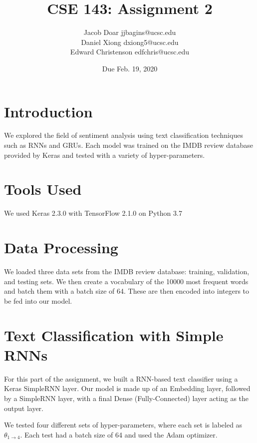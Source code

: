 \documentclass[12pt,notitlepage]{article}
\title{CSE 143: Assignment 2}
\author{Jacob Doar jjbagins@ucsc.edu\\
	Daniel Xiong dxiong5@ucsc.edu\\
	Edward Christenson edfchris@ucsc.edu}
\date{Due Feb. 19, 2020}
\begin{document}
\maketitle

\section{Introduction}
\tab We explored the field of sentiment analysis using text classification techniques such as RNNs and GRUs. Each model was trained on the IMDB review database provided by Keras and tested with a variety of hyper-parameters.

\section{Tools Used}
\tab We used Keras 2.3.0 with TensorFlow 2.1.0 on Python 3.7

\section{Data Processing}
\tab We loaded three data sets from the IMDB review database: training, validation, and testing sets. We then create a vocabulary of the 10000 most frequent words and batch them with a batch size of 64. These are then encoded into integers to be fed into our model.

\section{Text Classification with Simple RNNs}
\tab For this part of the assignment, we built a RNN-based text classifier using a Keras SimpleRNN layer. Our model is made up of an Embedding layer, followed by a SimpleRNN layer, with a final Dense (Fully-Connected) layer acting as the output layer.

\par We tested four different sets of hyper-parameters, where each set is labeled as $\theta_{1\rightarrow4}$. Each test had a batch size of 64 and used the Adam optimizer.
\end{document}
